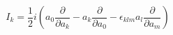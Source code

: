 \begin{equation}
I_k= \frac{1}{2} i( a_0 \frac{\partial}{\partial a_k} - a_k \frac{\partial}{\partial a_0} -\epsilon_{klm} a_l \frac{\partial}{\partial a_m})
\end{equation}

